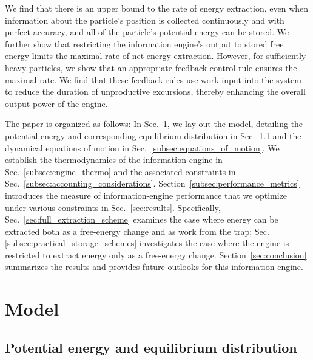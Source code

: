 \documentclass[%
reprint,
bibnotes, amsmath, amssymb, aps, pre,
 showkeys,
floatfix
]{revtex4-2}
\begin{document}
We find that there is an upper bound to the rate of energy extraction, even when information about the particle's position is collected continuously and with perfect accuracy, and all of the particle's potential energy can be stored.
We further show that restricting the information engine's output to stored free energy limits the maximal rate of net energy extraction.
However, for sufficiently heavy particles, we show that an appropriate feedback-control rule ensures the maximal rate. 
We find that these feedback rules use work input into the system to reduce the duration of unproductive excursions, thereby enhancing the overall output power of the engine.

The paper is organized as follows: 
In Sec.~\ref{sec:model}, we lay out the model, detailing the potential energy and corresponding equilibrium distribution in Sec.~\ref{subsec:potential_energy_equil} and the dynamical equations of motion in Sec.~\ref{subsec:equations_of_motion}.
We establish the thermodynamics of the information engine in Sec.~\ref{subsec:engine_thermo} and the associated constraints in Sec.~\ref{subsec:accounting_considerations}.
Section~\ref{subsec:performance_metrics} introduces the measure of information-engine performance that we optimize under various constraints in Sec.~\ref{sec:results}.
Specifically, Sec.~\ref{sec:full_extraction_scheme} examines the case where energy can be extracted both as a free-energy change and as work from the trap; 
Sec. \ref{subsec:practical_storage_schemes} investigates the case where the engine is restricted to extract energy only as a free-energy change.
Section~\ref{sec:conclusion} summarizes the results and provides future outlooks for this information engine.



\section{Model}
\label{sec:model}

\subsection{Potential energy and equilibrium distribution}
\label{subsec:potential_energy_equil}
\end{document}
